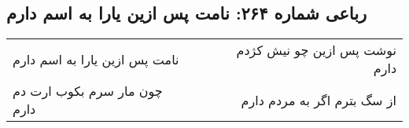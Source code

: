 \begin{center}
\section*{رباعی شماره ۲۶۴: نامت پس ازین یارا به اسم دارم}
\label{sec:sh264}
\begin{longtable}{l p{0.5cm} r}
نامت پس ازین یارا به اسم دارم
&&
نوشت پس ازین چو نیش کژدم دارم
\\
چون مار سرم بکوب ارت دم دارم
&&
از سگ بترم اگر به مردم دارم
\\
\end{longtable}
\end{center}
